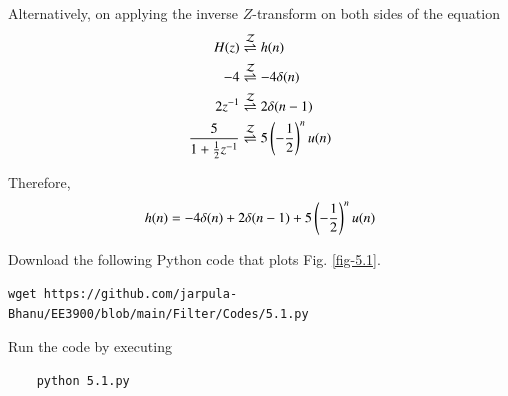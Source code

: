 \documentclass[journal,12pt,twocolumn]{IEEEtran}
\renewcommand\thesection{\arabic{section}}
\begin{document}
\begin{enumerate}[label=\thesection.\arabic*
,ref=\thesection.\theenumi]
Alternatively, on applying the inverse $Z$-transform on both sides of the equation
\begin{align}
	H(z) &\overset{\mathcal{Z}}{ \rightleftharpoons} h(n) \\
	-4 &\overset{\mathcal{Z}}{ \rightleftharpoons} -4\delta(n) \\
	2z^{-1} &\overset{\mathcal{Z}}{ \rightleftharpoons} 2\delta(n - 1) \\
	\frac{5}{1 + \frac12 z^{-1}} &\overset{\mathcal{Z}}{ \rightleftharpoons} 5\left(-\frac12\right)^n u(n) \\
\end{align}

Therefore,
\begin{equation}
	h(n) = -4\delta(n) + 2\delta(n - 1) + 5\left(-\frac12\right)^n u(n)
\end{equation}

Download the following Python code that plots Fig. \ref{fig-5.1}.
\begin{lstlisting}
wget https://github.com/jarpula-Bhanu/EE3900/blob/main/Filter/Codes/5.1.py
\end{lstlisting}

Run the code by executing
\begin{lstlisting}
	python 5.1.py
\end{lstlisting}


\end{enumerate}
\end{document}
